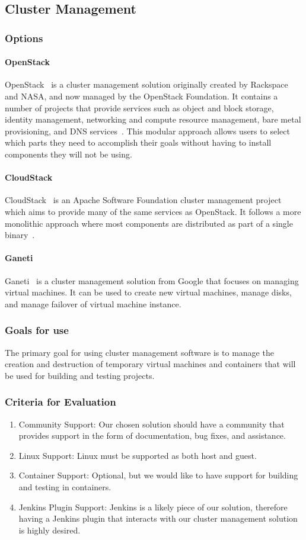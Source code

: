 \documentclass[10pt,letterpaper,onecolumn,draftclsnofoot]{IEEEtran}
\begin{document}
\subsection{Cluster Management}
\subsubsection{Options}
\paragraph{OpenStack}
OpenStack~\cite{openstackmain} is a cluster management solution originally created by Rackspace and NASA, and now managed by the OpenStack Foundation.
It contains a number of projects that provide services such as object and block storage, identity management, networking and compute resource management, bare metal provisioning, and DNS services~\cite{openstackservices}.
This modular approach allows users to select which parts they need to accomplish their goals without having to install components they will not be using.
\paragraph{CloudStack}
CloudStack~\cite{cloudstackmain} is an Apache Software Foundation cluster management project which aims to provide many of the same services as OpenStack.
It follows a more monolithic approach where most components are distributed as part of a single binary~\cite{cloudstackmono}.
\paragraph{Ganeti}
Ganeti~\cite{ganetimain} is a cluster management solution from Google that focuses on managing virtual machines.
It can be used to create new virtual machines, manage disks, and manage failover of virtual machine instance.
\subsubsection{Goals for use}
The primary goal for using cluster management software is to manage the creation and destruction of temporary virtual machines and containers that will be used for building and testing projects.
\subsubsection{Criteria for Evaluation}
\begin{enumerate}
  \item Community Support: Our chosen solution should have a community that provides support in the form of documentation, bug fixes, and assistance.
  \item Linux Support: Linux must be supported as both host and guest.
  \item Container Support: Optional, but we would like to have support for building and testing in containers.
  \item Jenkins Plugin Support: Jenkins is a likely piece of our solution, therefore having a Jenkins plugin that interacts with our cluster management solution is highly desired.
\end{enumerate}
\end{document}

